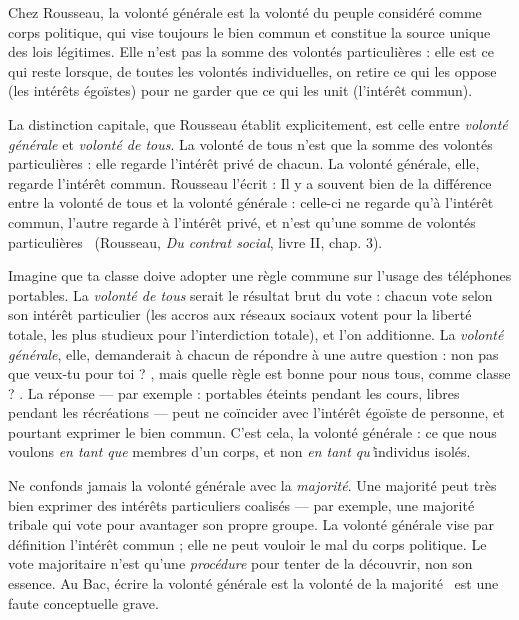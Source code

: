 \documentclass[11pt]{article}
\newcommand{\cle}[1]{{\popxbold\color{popdark}#1}}
\begin{document}
\begin{definition}
Chez Rousseau, la \cle{volonté générale} est la volonté du peuple considéré comme corps politique, qui vise toujours le bien commun et constitue la source unique des lois légitimes. Elle n'est pas la somme des volontés particulières : elle est ce qui reste lorsque, de toutes les volontés individuelles, on retire ce qui les oppose (les intérêts égoïstes) pour ne garder que ce qui les unit (l'intérêt commun).
\end{definition}

La distinction capitale, que Rousseau établit explicitement, est celle entre \emph{volonté générale} et \emph{volonté de tous}. La \cle{volonté de tous} n'est que la somme des volontés particulières : elle regarde l'intérêt privé de chacun. La volonté générale, elle, regarde l'intérêt commun. Rousseau l'écrit : \guillemotleft Il y a souvent bien de la différence entre la volonté de tous et la volonté générale : celle-ci ne regarde qu'à l'intérêt commun, l'autre regarde à l'intérêt privé, et n'est qu'une somme de volontés particulières \guillemotright\ (Rousseau, \emph{Du contrat social}, livre II, chap. 3).

\begin{exemplebox}
Imagine que ta classe doive adopter une règle commune sur l'usage des téléphones portables. La \emph{volonté de tous} serait le résultat brut du vote : chacun vote selon son intérêt particulier (les accros aux réseaux sociaux votent pour la liberté totale, les plus studieux pour l'interdiction totale), et l'on additionne. La \emph{volonté générale}, elle, demanderait à chacun de répondre à une autre question : non pas \guillemotleft que veux-tu pour toi ? \guillemotright, mais \guillemotleft quelle règle est bonne pour nous tous, comme classe ? \guillemotright. La réponse — par exemple : portables éteints pendant les cours, libres pendant les récréations — peut ne coïncider avec l'intérêt égoïste de personne, et pourtant exprimer le bien commun. C'est cela, la volonté générale : ce que nous voulons \emph{en tant que} membres d'un corps, et non \emph{en tant qu'}individus isolés.
\end{exemplebox}

\begin{attention}
Ne confonds jamais la volonté générale avec la \emph{majorité}. Une majorité peut très bien exprimer des intérêts particuliers coalisés — par exemple, une majorité tribale qui vote pour avantager son propre groupe. La volonté générale vise par définition l'intérêt commun ; elle ne peut vouloir le mal du corps politique. Le vote majoritaire n'est qu'une \emph{procédure} pour tenter de la découvrir, non son essence. Au Bac, écrire \guillemotleft la volonté générale est la volonté de la majorité \guillemotright\ est une faute conceptuelle grave.
\end{attention}
\end{document}
